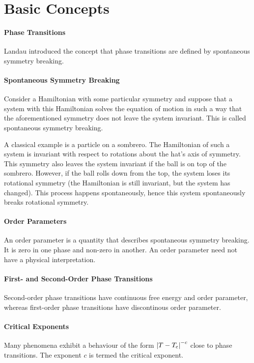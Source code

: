 \section{Basic Concepts}

\paragraph{Phase Transitions}
Landau introduced the concept that phase transitions are defined by spontaneous symmetry breaking.

\paragraph{Spontaneous Symmetry Breaking}
Consider a Hamiltonian with some particular symmetry and suppose that a system with this Hamiltonian solves the equation of motion in such a way that the aforementioned symmetry does not leave the system invariant. This is called spontaneous symmetry breaking.

A classical example is a particle on a sombrero. The Hamiltonian of such a system is invariant with respect to rotations about the hat's axis of symmetry. This symmetry also leaves the system invariant if the ball is on top of the sombrero. However, if the ball rolls down from the top, the system loses its rotational symmetry (the Hamiltonian is still invariant, but the system has changed). This process happens spontaneously, hence this system spontaneously breaks rotational symmetry.

\paragraph{Order Parameters}
An order parameter is a quantity that describes spontaneous symmetry breaking. It is zero in one phase and non-zero in another. An order parameter need not have a physical interpretation.

\paragraph{First- and Second-Order Phase Transitions}
Second-order phase transitions have continuous free energy and order parameter, whereas first-order phase transitions have discontinous order parameter.

\paragraph{Critical Exponents}
Many phenomena exhibit a behaviour of the form $\abs{T - T_{\text{c}}}^{-c}$ close to phase transitions. The exponent $c$ is termed the critical exponent.

